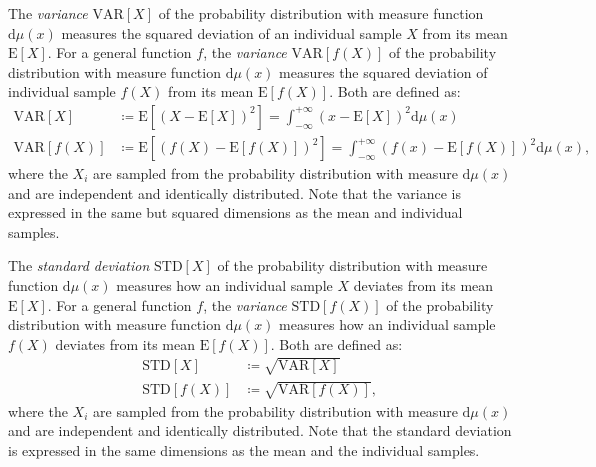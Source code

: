 \documentclass[10pt,a4paper]{article}
\numberwithin{equation}{section}
\begin{document}
The \textit{variance} $\mathrm{VAR}\left[X\right]$ of the probability distribution with measure function $\mathrm{d}\mu\left(x\right)$ measures the squared deviation of an individual sample $X$ from its mean $\mathrm{E}\left[X\right]$. For a general function $f$, the \textit{variance} $\mathrm{VAR}\left[f\left(X\right)\right]$ of the probability distribution with measure function $\mathrm{d}\mu\left(x\right)$ measures the squared deviation of individual sample $f\left(X\right)$ from its mean $\mathrm{E}\left[f\left(X\right)\right]$. Both are defined as:
\begin{align}
\label{equation:VAR}\mathrm{VAR}\left[X\right] 					&\coloneqq  \mathrm{E}\left[{\left(X-\mathrm{E}\left[X\right]\right)}^{2}\right] = \int_{-\infty}^{+\infty} {\left(x-\mathrm{E}\left[X\right]\right)}^{2} \mathrm{d}\mu\left(x\right) \\
\label{equation:VARf}\mathrm{VAR}\left[f\left(X\right)\right] 	&\coloneqq  \mathrm{E}\left[{\left(f\left(X\right)-\mathrm{E}\left[f\left(X\right)\right]\right)}^{2}\right] = \int_{-\infty}^{+\infty} {\left(f\left(x\right)-\mathrm{E}\left[f\left(X\right)\right]\right)}^{2} \mathrm{d}\mu\left(x\right),
\end{align}
where the $X_{i}$ are sampled from the probability distribution with measure $\mathrm{d}\mu\left(x\right)$ and are independent and identically distributed. Note that the variance is expressed in the same but squared dimensions as the mean and individual samples.

The \textit{standard deviation} $\mathrm{STD}\left[X\right]$ of the probability distribution with measure function $\mathrm{d}\mu\left(x\right)$ measures how an individual sample $X$ deviates from its mean $\mathrm{E}\left[X\right]$. For a general function $f$, the \textit{variance} $\mathrm{STD}\left[f\left(X\right)\right]$ of the probability distribution with measure function $\mathrm{d}\mu\left(x\right)$ measures how an individual sample $f\left(X\right)$ deviates from its mean $\mathrm{E}\left[f\left(X\right)\right]$. Both are defined as:
\begin{align}
\label{equation:STD}\mathrm{STD}\left[X\right] 					&\coloneqq \sqrt{\mathrm{VAR}\left[X\right]} \\
\label{equation:STDf}\mathrm{STD}\left[f\left(X\right)\right] 	&\coloneqq \sqrt{\mathrm{VAR}\left[f\left(X\right)\right]},
\end{align}
where the $X_{i}$ are sampled from the probability distribution with measure $\mathrm{d}\mu\left(x\right)$ and are independent and identically distributed. Note that the standard deviation is expressed in the same dimensions as the mean and the individual samples.
\end{document}

